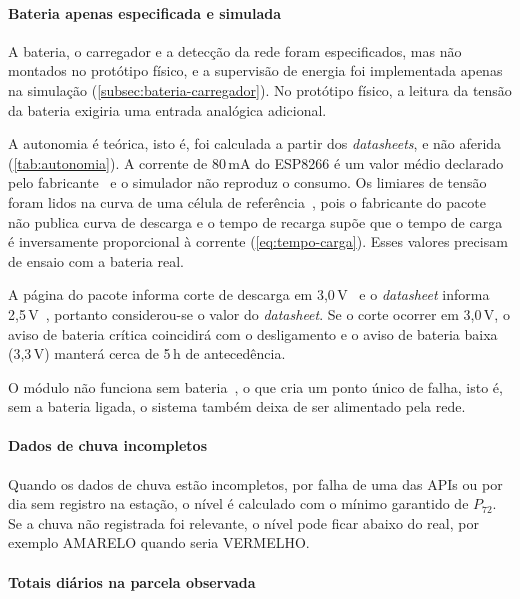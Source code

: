 \paragraph*{Bateria apenas especificada e simulada}

A bateria, o carregador e a detecção da rede foram especificados, mas
não montados no protótipo físico, e a supervisão de energia foi
implementada apenas na simulação (\autoref{subsec:bateria-carregador}).
No protótipo físico, a leitura da tensão da bateria exigiria uma entrada
analógica adicional.

A autonomia é teórica, isto é, foi calculada a partir dos \textit{datasheets}, e não aferida (\autoref{tab:autonomia}). A corrente de 80\,mA do ESP8266 é
um valor médio declarado pelo fabricante~\cite{espressif_esp8266ex} e o simulador não reproduz o consumo.
Os limiares de tensão foram lidos na curva de uma célula de referência~\cite{panasonic_ncr18650b}, pois o fabricante do pacote não publica curva de descarga e o tempo de recarga supõe que o tempo de carga é
inversamente proporcional à corrente (\autoref{eq:tempo-carga}). Esses
valores precisam de ensaio com a bateria real.

A página do pacote informa corte de descarga em 3,0\,V~\cite{adafruit_5035} e o \textit{datasheet} informa 2,5\,V~\cite{pkcell2021icr18650}, portanto considerou-se o valor do \textit{datasheet}. Se o corte ocorrer em 3,0\,V, o aviso de bateria
crítica coincidirá com o desligamento e o aviso de bateria baixa
(3,3\,V) manterá cerca de 5\,h de antecedência.

O módulo não funciona sem bateria~\cite{adafruit_2465_produto}, o que cria
um ponto único de falha, isto é, sem a bateria ligada, o sistema também deixa
de ser alimentado pela rede.

\paragraph*{Dados de chuva incompletos}

Quando os dados de chuva estão incompletos, por falha de uma das APIs ou
por dia sem registro na estação, o nível é calculado com o mínimo
garantido de $P_{72}$. Se a chuva não registrada foi relevante, o nível
pode ficar abaixo do real, por exemplo AMARELO quando seria VERMELHO.

\paragraph*{Totais diários na parcela observada}

